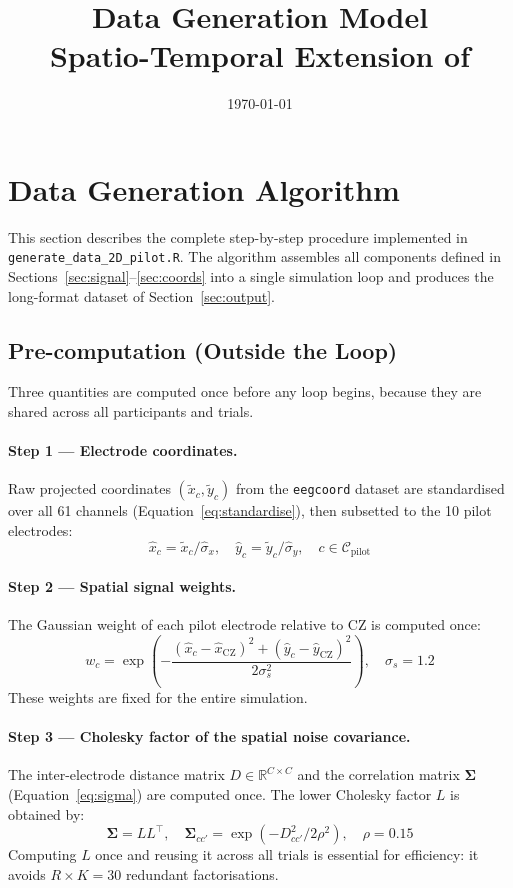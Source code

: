 \documentclass[12pt, a4paper]{article}
\title{\textbf{Data Generation Model}\\[4pt]
       \large Spatio-Temporal Extension of \citet{Nalborczyk2025}}
\author{}
\date{\today}
\begin{document}
\maketitle
\tableofcontents
\bigskip

\section{Data Generation Algorithm}\label{sec:algorithm}

This section describes the complete step-by-step procedure implemented in
\texttt{generate\_data\_2D\_pilot.R}.
The algorithm assembles all components defined in Sections~\ref{sec:signal}--\ref{sec:coords}
into a single simulation loop and produces the long-format dataset of
Section~\ref{sec:output}.

\subsection{Pre-computation (Outside the Loop)}\label{sec:precompute}

Three quantities are computed once before any loop begins, because they
are shared across all participants and trials.

\paragraph{Step 1 --- Electrode coordinates.}
Raw projected coordinates $(\tilde{x}_c, \tilde{y}_c)$ from the
\texttt{eegcoord} dataset are standardised over all 61 channels
(Equation~\ref{eq:standardise}), then subsetted to the 10 pilot electrodes:
\[
  \hat{x}_c = \tilde{x}_c / \hat{\sigma}_x, \quad
  \hat{y}_c = \tilde{y}_c / \hat{\sigma}_y,
  \quad c \in \mathcal{C}_\text{pilot}
\]

\paragraph{Step 2 --- Spatial signal weights.}
The Gaussian weight of each pilot electrode relative to CZ is computed once:
\[
  w_c = \exp\!\left(-\frac{(\hat{x}_c - \hat{x}_\text{CZ})^2
                          + (\hat{y}_c - \hat{y}_\text{CZ})^2}
                         {2\sigma_s^2}\right), \quad \sigma_s = 1.2
\]
These weights are fixed for the entire simulation.

\paragraph{Step 3 --- Cholesky factor of the spatial noise covariance.}
The inter-electrode distance matrix $D \in \mathbb{R}^{C \times C}$ and
the correlation matrix $\boldsymbol{\Sigma}$ (Equation~\ref{eq:sigma})
are computed once. The lower Cholesky factor $L$ is obtained by:
\[
  \boldsymbol{\Sigma} = LL^\top, \quad
  \boldsymbol{\Sigma}_{cc'} = \exp\!\left(-D_{cc'}^2 / 2\rho^2\right),
  \quad \rho = 0.15
\]
Computing $L$ once and reusing it across all trials is essential for
efficiency: it avoids $R \times K = 30$ redundant factorisations.
\end{document}
